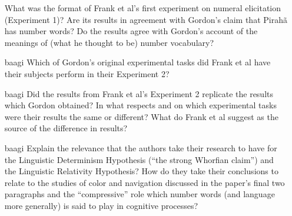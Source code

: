 \documentclass[]{article}
\begin{document}
\begin{itemize}
  What was the format of Frank et al's first experiment on numeral
  elicitation (Experiment 1)? Are its results in agreement with Gordon's
  claim that Pirahã has number words? Do the results agree with Gordon's
  account of the meanings of (what he thought to be) number vocabulary?
\item [baagi]
  Which of Gordon's original experimental tasks did Frank et al have
  their subjects perform in their Experiment 2?
\item [baagi]
  Did the results from Frank et al's Experiment 2 replicate the results
  which Gordon obtained? In what respects and on which experimental
  tasks were their results the same or different? What do Frank et al
  suggest as the source of the difference in results?
\item [baagi]
  Explain the relevance that the authors take their research to have for
  the Linguistic Determinism Hypothesis (``the strong Whorfian claim'')
  and the Linguistic Relativity Hypothesis? How do they take their
  conclusions to relate to the studies of color and navigation discussed
  in the paper's final two paragraphs and the ``compressive'' role which
  number words (and language more generally) is said to play in
  cognitive processes?
\end{itemize}
\end{document}
